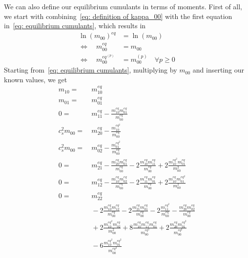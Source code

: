 We can also define our equilibrium cumulants in terms of moments.
First of all, we start with combining~\eqref{eq: definition of kappa_00} with the first equation in~\eqref{eq: equilibrium cumulants}, which results in
\begin{equation}
  \label{eq: m 00 invariant}
  \begin{aligned}
    {\ln(m_{00})}^{eq} &= \ln(m_{00}) \\
    \Leftrightarrow\quad m_{00}^{eq} &= m_{00} \\
    \Leftrightarrow\quad m_{00}^{eq^{(p)}} &= m_{00}^{(p)} \quad\forall p\ge 0
  \end{aligned}
\end{equation}
Starting from~\eqref{eq: equilibrium cumulants}, multiplying by $m_{00}$ and inserting our known values, we get
\begin{equation}
  \begin{aligned}
    m_{10} = &\ m_{10}^{eq}
    \\
     m_{01} = &\ m_{01}^{eq}
    \\
    0 = &\ m_{11}^{eq} - \frac{m_{10}^{eq}m_{01}^{eq}}{m_{00}^{eq}}
    \\
    c_s^2 m_{00} = &\ m_{20}^{eq} - \frac{m_{10}^{{eq}^2}}{m_{00}^{eq}}
    \\
    c_s^2 m_{00} = &\ m_{02}^{eq} - \frac{m_{01}^{{eq}^2}}{m_{00}^{eq}}
    \\
    0 = &\ m_{21}^{eq} - \frac{m_{20}^{eq}m_{01}^{eq}}{m_{00}^{eq}} - 2\frac{m_{10}^{eq}m_{11}^{eq}} {m_{00}^{eq}} + 2\frac{m_{10}^{{eq}^2} m_{01}^{eq}}{m_{00}^2}
    \\
    0 = &\ m_{12}^{eq} - \frac{m_{10}^{eq}m_{02}^{eq}}{m_{00}^{eq}}
    - 2\frac{m_{11}^{eq}m_{01}^{eq}}{m_{00}^{eq}} + 2\frac{m_{10}^{eq} m_{01}^{{eq}^2}}{m_{00}^2}
    \\
    0 = &\ m_{22}^{eq}
    \\&\
    - 2 \frac{m_{10}^{eq}m_{12}^{eq}}{m_{00}^{eq}} - 2\frac{m_{21}^{eq}m_{01}^{eq}}{m_{00}^{eq}}
    - 2 \frac{m_{11}^{{eq}^2}}{m_{00}^{eq}} - \frac{m_{20}^{eq}m_{02}^{eq}}{m_{00}^{eq}}
    \\&\
    + 2 \frac{m_{10}^{{eq}^2} m_{02}^{eq}}{m_{00}^2} + 8 \frac{m_{10}^{eq}m_{11}^{eq}m_{01}^{eq}} {m_{00}^{{eq}^2}}
    + 2 \frac{m_{20}^{eq}m_{01}^{{eq}^2}}{m_{00}^{{eq}^2}}
    \\&\
    - 6 \frac{m_{10}^{{eq}^2} m_{01}^{{eq}^2}}{m_{00}^{{eq}^3}}
  \end{aligned}
\end{equation}
